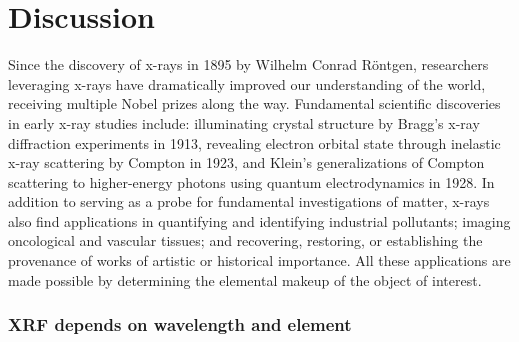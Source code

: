\documentclass[%
  aip,12pt,tightenlines,
  amsthm,
 amsmath,amssymb,
 reprint,%
]{revtex4-1}
\newcommand{\fLabel}[1]{\label{figure:#1}}
\newcommand{\sLabel}[1]{\label{section:#1}}
\newcommand{\pcaption}[1]{\caption{\noindent#1}}
\newcommand{\firstp}[0]{\noindent}
\newcommand{\pl}[0]{\vspace{6pt}}
\newcommand{\pEndF}[0]{ \\ }
\newcommand{\pStartF}[0]{ }
\begin{document}
\section{\sLabel{Discussion}Discussion}


\firstp Since the discovery of x-rays in 1895 by Wilhelm Conrad R{\"o}ntgen, researchers leveraging x-rays have dramatically improved our understanding of the world, receiving multiple Nobel prizes along the way.\cite{santra_concepts_2009} Fundamental scientific discoveries in early x-ray studies include: illuminating crystal structure by Bragg's x-ray diffraction experiments in 1913,\cite{bragg_reflection_1913} revealing electron orbital state through inelastic x-ray scattering by Compton in 1923,\cite{compton_spectrum_1923} and Klein's generalizations of Compton scattering to higher-energy photons using quantum electrodynamics in 1928.\cite{klein_scattering_1928} In addition to serving as a probe for fundamental investigations of matter, x-rays also find applications in quantifying and identifying industrial pollutants;\cite{luo_determination_2012} imaging oncological and vascular tissues;\cite{butler_bio-medical_2008} and recovering, restoring, or establishing the provenance of works of artistic \cite{janssens_photon-based_2010} or historical \cite{bergmann_archimedes_2007} importance. All these applications are made possible by determining the elemental makeup of the object of interest. \pl


\subsubsection{\sLabel{Beer}XRF depends on wavelength and element}
\end{document}
